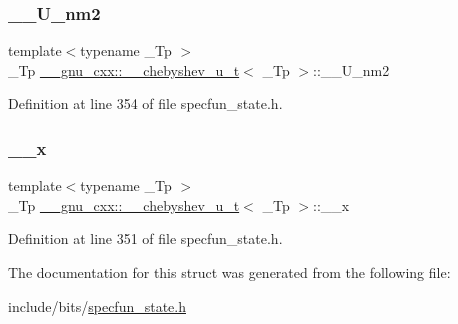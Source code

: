 \subsubsection{\texorpdfstring{\+\_\+\+\_\+\+U\+\_\+nm2}{\_\_U\_nm2}}
{\footnotesize\ttfamily template$<$typename \+\_\+\+Tp $>$ \\
\+\_\+\+Tp \hyperlink{struct____gnu__cxx_1_1____chebyshev__u__t}{\+\_\+\+\_\+gnu\+\_\+cxx\+::\+\_\+\+\_\+chebyshev\+\_\+u\+\_\+t}$<$ \+\_\+\+Tp $>$\+::\+\_\+\+\_\+\+U\+\_\+nm2}



Definition at line 354 of file specfun\+\_\+state.\+h.

\mbox{\label{struct____gnu__cxx_1_1____chebyshev__u__t_a038c998d409d5fb0404df67afb9b217c}} 
\subsubsection{\texorpdfstring{\+\_\+\+\_\+x}{\_\_x}}
{\footnotesize\ttfamily template$<$typename \+\_\+\+Tp $>$ \\
\+\_\+\+Tp \hyperlink{struct____gnu__cxx_1_1____chebyshev__u__t}{\+\_\+\+\_\+gnu\+\_\+cxx\+::\+\_\+\+\_\+chebyshev\+\_\+u\+\_\+t}$<$ \+\_\+\+Tp $>$\+::\+\_\+\+\_\+x}



Definition at line 351 of file specfun\+\_\+state.\+h.



The documentation for this struct was generated from the following file\+:\begin{DoxyCompactItemize}
\item 
include/bits/\hyperlink{specfun__state_8h}{specfun\+\_\+state.\+h}\end{DoxyCompactItemize}
